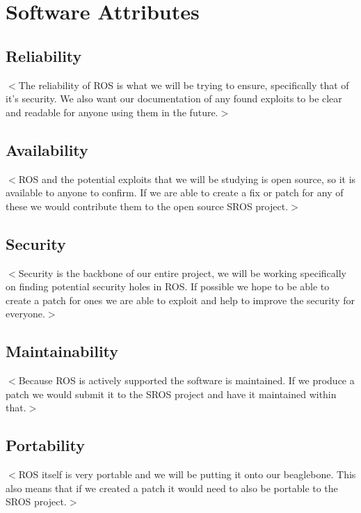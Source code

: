 \documentclass{scrreprt}
\begin{document}
\section{Software Attributes}
  \subsection{Reliability}
  $<$The reliability of ROS is what we will be trying to ensure, specifically that of it's security. 
  We also want our documentation of any found exploits to be clear and readable for anyone using them in the future.$>$
 
  \subsection{Availability}
  $<$ROS and the potential exploits that we will be studying is open source, so it is available to anyone to confirm.
  If we are able to create a fix or patch for any of these we would contribute them to the open source SROS project.$>$

  \subsection{Security}
  $<$Security is the backbone of our entire project, we will be working specifically on finding potential security holes in ROS.
  If possible we hope to be able to create a patch for ones we are able to exploit and help to improve the security for everyone.$>$

  \subsection{Maintainability}
  $<$Because ROS is actively supported the software is maintained.
  If we produce a patch we would submit it to the SROS project and have it maintained within that.$>$

  \subsection{Portability}
  $<$ROS itself is very portable and we will be putting it onto our beaglebone.
  This also means that if we created a patch it would need to also be portable to the SROS project.$>$
\end{document}

